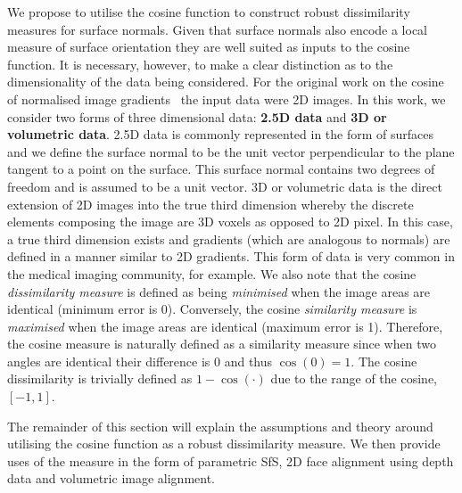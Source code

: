 We propose to utilise the cosine function to construct robust dissimilarity
measures for surface normals. Given that surface normals also encode a local
measure of surface orientation they are well suited as inputs to the cosine
function. It is necessary, however, to make a clear distinction as to the
dimensionality of the data being considered. For the original work
on the cosine of normalised image gradients~\cite{tzimiropoulos2012subspace}
the input data were 2D images. In this work, we consider two forms of three
dimensional data: \textbf{2.5D data} and \textbf{3D or volumetric data}.
2.5D data is commonly represented in the form of surfaces and we define
the surface normal to be the unit vector perpendicular to the plane
tangent to a point on the surface. This surface normal contains
two degrees of freedom and is assumed to be a unit vector. 3D or volumetric
data is the direct extension of 2D images into the true third dimension
whereby the discrete elements composing the image are 3D voxels as opposed to
2D pixel. In this case, a true third dimension exists and gradients (which
are analogous to normals) are defined in a manner similar to 2D gradients. This
form of data is very common in the medical imaging community, for example.
We also note that the cosine \textit{dissimilarity measure} is defined as being
\textit{minimised} when the image areas are identical (minimum error is 0). 
Conversely, the cosine \textit{similarity measure} is \textit{maximised} when 
the image  areas are identical (maximum error is 1). Therefore, the 
cosine measure is naturally defined as a similarity measure since when
two angles are identical their difference is 0 and thus $\cos(0) = 1$. The
cosine dissimilarity is trivially defined as $1 - \cos(\cdot)$ due to the range
of the cosine, $[-1, 1]$.

The remainder of this section will explain the assumptions and theory around
utilising the cosine function as a robust dissimilarity measure. We then
provide uses of the measure in the form of parametric SfS, 2D face
alignment using depth data and volumetric image alignment.
